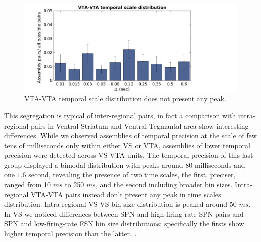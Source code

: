 \begin{figure}[H]
\includegraphics[scale=0.45]{figures/VTA_VTA_S.png}
\caption{VTA-VTA temporal scale distribution does not present any peak.}
\label{fig:BinDistr}
\end{figure}
This segregation is typical of inter-regional pairs, in fact a comparison with intra-regional pairs in Ventral Striatum and Ventral Tegmantal area show interesting differences.
While we observed assemblies of temporal precision at the scale of few tens of milliseconds only within either VS or VTA, assemblies of lower temporal precision were detected across VS-VTA units. The temporal precision of this last group displayed a bimodal distribution with peaks around $80$ milliseconds and one $1.6$ second, revealing the presence of two time scales, the first, preciser, ranged from 10 $ms$ to 250 $ms$, and the second including broader bin sizes. Intra-regional VTA-VTA pairs instead don't present any peak in time scales distribution. Intra-regional VS-VS bin size distribution is peaked around 50 $ms$. In VS we noticed differences between SPN and high-firing-rate SPN pairs and SPN and low-firing-rate FSN bin size distributions: specifically the firsts show higher temporal precision than the latter. {\color{red}{Include Figure of SPN -FSN and caption of bin size distribution}}.
